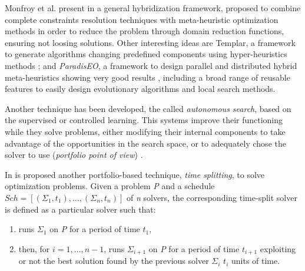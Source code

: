Monfroy et al. present in \cite{Monfroya,Monfroyb} a general hybridization framework, proposed to combine complete constraints resolution techniques with meta-heuristic optimization methods in order to reduce the problem through domain reduction functions, ensuring not loosing solutions. Other interesting ideas are {\sc Templar}, a framework to generate algorithms changing predefined components using hyper-heuristics methods \cite{Swan2015}; and {\it ParadisEO}, a framework to design parallel and distributed hybrid meta-heuristics showing very good results \cite{Cahon2004}, including a broad range of reusable features to easily design evolutionary algorithms and local search methods.

Another technique has been developed, the called {\it autonomous search}, based on the supervised or controlled learning. This systems improve their functioning while they solve problems, either  modifying their internal components to take advantage of the opportunities in the search space, or to adequately chose the solver to use ({\it portfolio point of view}) \cite{WhatIsAuto}.

In \cite{Amadini2014} is proposed another portfolio-based technique, \textit{time splitting}, to solve optimization problems. Given a problem \textit{P} and a schedule $Sch = \left[(\Sigma_1, t_1),\dots,(\Sigma_n, t_n)\right]$ of \textit{n} solvers, the corresponding time-split solver is defined as a particular solver such that:  
\begin{enumerate}[label=\alph*)]
\item runs $\Sigma_1$ on \textit{P} for a period of time $t_1$, 
\item then, for $i = 1,\dots, n-1$, runs $\Sigma_{i+1}$ on \textit{P} for a period of time $t_{i+1}$ exploiting or not the best solution found by the previous solver $\Sigma_i$ $t_i$ units of time.
\end{enumerate}




